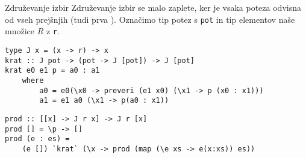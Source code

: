 \documentclass{beamer}
\begin{document}
\begin{frame}[fragile]{Združevanje izbir}%
Združevanje izbir se malo zaplete, ker je vsaka poteza odvisna od vseh prejšnjih (tudi prva \smiley).
Označimo tip potez s \texttt{pot} in tip elementov naše množice $R$ z \texttt{r}.
\pause
\begin{lstlisting}
type J x = (x -> r) -> x
krat :: J pot -> (pot -> J [pot]) -> J [pot]
krat e0 e1 p = a0 : a1
    where
        a0 = e0(\x0 -> preveri (e1 x0) (\x1 -> p (x0 : x1)))
        a1 = e1 a0 (\x1 -> p(a0 : x1))
\end{lstlisting}
\pause
\begin{lstlisting}
prod :: [[x] -> J r x] -> J r [x]
prod [] = \p -> []
prod (e : es) =  
    (e []) `krat` (\x -> prod (map (\e xs -> e(x:xs)) es))
\end{lstlisting}
\end{frame}
\end{document}
